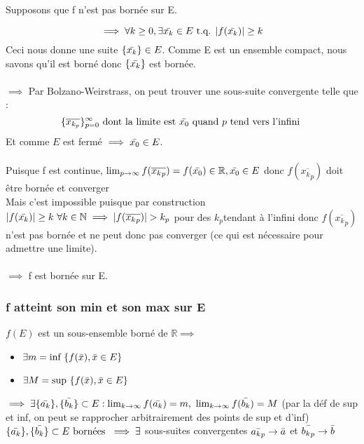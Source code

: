 \documentclass{article}
\begin{document}
Supposons que f n'est pas bornée sur E.

\[ \implies \forall k \geq 0, \exists \Bar{x_k} \in E \text{ t.q. } |f(\Bar{x_k})| \geq k \]
Ceci nous donne une suite $ \{\Bar{x_k}\} \in E $. Comme E est un ensemble compact, nous savons qu'il est borné donc $ \{\Bar{x_k}\} $ est bornée.\\\\
$ \implies $ Par Bolzano-Weirstrass, on peut trouver une sous-suite convergente telle que :
\[ \{ \overline{x_{k_p}}\}_{p = 0}^{\infty} \text{ dont la limite est } \Bar{x_0} \text{ quand $ p $ tend vers l'infini } \]
Et comme $ E $ est fermé $ \implies \Bar{x_0} \in E $.\\\\
Puisque f est continue, $\lim_{p\to\infty} f(\overline{{x_k}_p}) = f(\Bar{x_0}) \in \mathbb{R}, \Bar{x_0} \in E $ donc $f(\overline{{x_k}_p})$ doit être bornée et converger\\
Mais c'est impossible puisque par construction $ |f(\Bar{x_k})| \geq k\ \forall k \in \mathbb{N} \implies |f(\overline{{x_k}_p})| > k_p$ pour des $k_p$tendant à l'infini donc $f(\overline{{x_k}_p}) $ n'est pas bornée et ne peut donc pas converger (ce qui est nécessaire pour admettre une limite).\\\\
$ \implies $ f est bornée sur E.

\subsubsection{f atteint son min et son max sur E}

$ f(E) $ est un sous-ensemble borné de $ \mathbb{R} \implies $
\begin{itemize}
    \item $ \exists m = \text{inf } \{f(\Bar{x}), \Bar{x} \in E \}$
    \item $ \exists M = \text{sup } \{f(\Bar{x}), \Bar{x} \in E \}$
\end{itemize}

$ \implies \exists \{\Bar{a_k}\}, \{\Bar{b_k}\} \subset E : \lim_{k\to\infty} f(\Bar{a_k}) = m,\ \lim_{k\to\infty} f(\Bar{b_k}) = M $ (par la déf de sup et inf, on peut se rapprocher arbitrairement des points de sup et d'inf)\\

$ \{\Bar{a_k}\},\{\Bar{b_k}\} \subset E \text{ bornées } \implies \exists $ sous-suites convergentes $ \Bar{{a_k}_p} \to \Bar{a} $ et $ \Bar{{b_k}_p} \to \Bar{b} $
\end{document}
